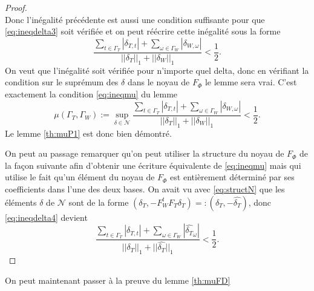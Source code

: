 \begin{proof}
\begin{equation}
		\end{equation}
		Donc l'inégalité précédente est aussi une condition suffisante pour que \ref{eq:ineqdelta3} soit vérifiée et on peut réécrire cette inégalité sous la forme
		\begin{equation}\label{eq:ineqdelta4}
			\frac{\sum_{t \in \Gamma_T} |\delta_{T,t}| + \sum_{\omega \in \Gamma_W} |\delta_{W,\omega}|  }{||\delta_T||_1 + ||\delta_W||_1 } < \frac{1}{2}.
		\end{equation}
		On veut que l'inégalité soit vérifiée pour n'importe quel delta, donc en vérifiant la condition sur le suprémum des $\delta$ dans le noyau de $F_\Phi$ le lemme sera vrai.
		C'est exactement la condition \ref{eq:ineqmu} du lemme
		\begin{equation}
			\mu(\Gamma_T, \Gamma_W) := \sup_{\delta \in \mathcal{N}} \frac{\sum_{t \in \Gamma_T} |\delta_{T,t}| + \sum_{\omega \in \Gamma_W} |\delta_{W,\omega}|  }{||\delta_T||_1 + ||\delta_W||_1 } < \frac{1}{2}.
		\end{equation}
		Le lemme \ref{th:muP1} est donc bien démontré.
		
		
		On peut au passage remarquer qu'on peut utiliser la structure du noyau de $F_\Phi$ de la façon suivante afin d'obtenir une écriture équivalente de \ref{eq:ineqmu} mais qui utilise le fait qu'un élément du noyau de $F_\Phi$ est entièrement déterminé par ses coefficients dans l'une des deux bases.
		On avait vu avec \ref{eq:structN} que les éléments $\delta$ de $\mathcal{N}$ sont de la forme $(\delta_T, -F_W^t F_T \delta_T) =: (\delta_T, -\widehat{\delta_T})$, donc \ref{eq:ineqdelta4} devient
		\begin{equation}
			\frac{\sum_{t\in \Gamma_T} |\delta_{T, t}| + \sum_{\omega \in \Gamma_W} |\widehat{\delta_T}_\omega|}{||\delta_T||_1 + ||\widehat{\delta_T}||_1} < \frac{1}{2}.
		\end{equation}
	\end{proof}	
	On peut maintenant passer à la preuve du lemme \ref{th:muFD}
